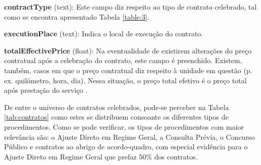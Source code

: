 \begin{my_itemize}
\item \textbf{contractType} (text): Este campo diz respeito ao tipo de contrato celebrado, tal como se encontra apresentado Tabela \ref{table:3}. 

\item \textbf{executionPlace} (text): Indica o local de execução do contrato. 

\item \textbf{totalEffectivePrice} (float): Na eventualidade de existirem alterações do preço contratual após a celebração do contrato, este campo é preenchido. Existem, também, casos em que o preço contratual diz respeito à unidade em questão (p. ex. quilómetro, hora, dia). Nessa situação, o preço total efetivo é o preço total após prestação do serviço \cite{jardinagem}.  

\end{my_itemize}

De entre o universo de contratos celebrados, pode-se perceber na Tabela \ref{tab:contratos} como estes se distribuem consoante os diferentes tipos de procedimentos. Como se pode verificar, os tipos de procedimentos com maior relevância são: o Ajuste Direto em Regime Geral, a Consulta Prévia, o Concurso Público e contratos ao abrigo de acordo-quadro, com especial evidência para o Ajuste Direto em Regime Geral que prefaz 50\% dos contratos. 


